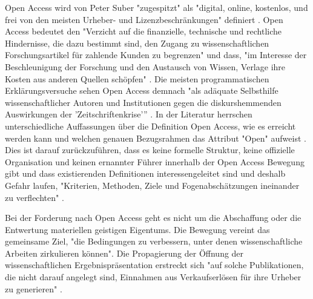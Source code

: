 Open Access wird von Peter Suber "zugespitzt" \cite{naeder_2010_open} als "digital, online, kostenlos, und frei von den meisten Urheber- und Lizenzbeschränkungen" \cite{suber_2012_open} definiert \cite{Adema_2014_open_access}. Open Access bedeutet den "Verzicht auf die finanzielle, technische und rechtliche Hindernisse, die dazu bestimmt sind, den Zugang zu wissenschaftlichen Forschungsartikel für zahlende Kunden zu begrenzen" und dass, "im Interesse der Beschleunigung der Forschung und den Austausch von Wissen, Verlage ihre Kosten aus anderen Quellen schöpfen" \cite{Suber_2002}. Die meisten programmatischen Erklärungsversuche sehen Open Access demnach "als adäquate Selbsthilfe wissenschaftlicher Autoren und Institutionen gegen die diskurshemmenden Auswirkungen der 'Zeitschriftenkrise'” \cite{naeder_2010_open}. In der Literatur herrschen unterschiedliche Auffassungen über die Definition Open Access, wie es erreicht werden kann und welchen genauen Bezugsrahmen das Attribut "Open" aufweist \cite{Adema_2014_open_access}. Dies ist darauf zurückzuführen, dass es keine formelle Struktur, keine offizielle Organisation und keinen ernannter Führer innerhalb der Open Access Bewegung gibt \cite{poynder_2011_suber} und dass existierenden Definitionen interessengeleitet sind und deshalb Gefahr laufen, "Kriterien, Methoden, Ziele und Fogenabschätzungen ineinander zu verflechten" \cite{naeder_2010_open}.

Bei der Forderung nach Open Access geht es nicht um die Abschaffung oder die Entwertung materiellen geistigen Eigentums. Die Bewegung vereint das gemeinsame Ziel, "die Bedingungen zu verbessern, unter denen wissenschaftliche Arbeiten zirkulieren können"\cite{Adema_2014_open_access}. Die Propagierung der Öffnung der wissenschaftlichen Ergebnispräsentation erstreckt sich "auf solche Publikationen, die nicht darauf angelegt sind, Einnahmen aus Verkaufserlösen für ihre Urheber zu generieren" \cite{muller_2010_open}.

